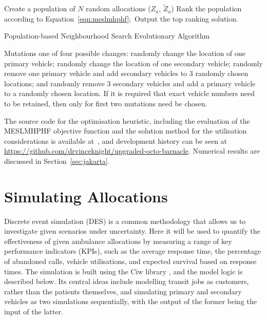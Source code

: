 \documentclass[preprint,12pt]{elsarticle}
\begin{document}
\begin{algorithm}
\SetAlgoLined
Create a population of $N$ random allocations ($Z_a$, $\tilde{Z}_a$)\;
Rank the population according to Equation~\ref{eqn:meslmhphf};\
Output the top ranking solution.
\caption{Population-based Neighbourhood Search Evolutionary Algorithm}
\label{alg:heuristic}
\end{algorithm}

Mutations one of four possible changes: randomly change the location of one
primary vehicle; randomly change the location of one secondary vehicle;
randomly remove one primary vehicle and add secondary vehicles to 3 randomly
chosen locations; and randomly remove 3 secondary vehicles and add a primary
vehicle to a randomly chosen location. If it is required that exact vehicle
numbers need to be retained, then only for first two mutations need be chosen.

The source code for the optimisation heuristic, including the evaluation of
the MESLMHPHF objective function and the solution method for the utilisation
considerations is available at~\cite{}, %
and development history can be seen at
\url{https://github.com/drvinceknight/upgraded-octo-barnacle}.
Numerical results are discussed in Section~\ref{sec:jakarta}.




\section{Simulating Allocations}\label{sec:simulation}
Discrete event simulation (DES) is a common methodology that allows us to
investigate given scenarios under uncertainty. Here it will be used to
quantify the effectiveness of given ambulance allocations by measuring a range
of key performance indicators (KPIs), such as the average response time, the
percentage of abandoned calls, vehicle utilisations, and expected survival
based on response times. The simulation is built using the Ciw library
\cite{palmer2019ciw}, and the model logic is described below. Its central
ideas include modelling transit jobs as customers, rather than the patients
themselves, and simulating primary and secondary vehicles as two simulations
sequentially, with the output of the former being the input of the latter.
\end{document}
